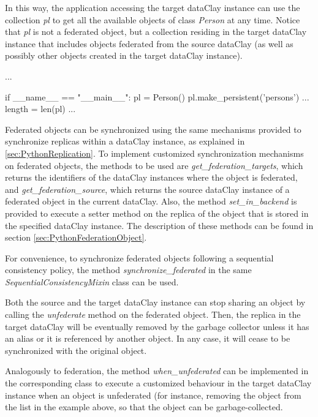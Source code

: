 \begin{tBox}
\begin{python}
class Person(DataClayObject):
     ...

     @dclayMethod()
     def when_federated():
     pl = PersonList.get_by_alias('persons')
     pl.add(self);
  }
}
\end{python}
\end{tBox}

In this way, the application accessing the target dataClay instance can use the collection \textit{pl} to get all the available objects of class \textit{Person} at any time. Notice that \textit{pl} is not a federated object, but a collection residing in the target dataClay instance that includes objects federated from the source dataClay (as well as possibly other objects created in the target dataClay instance).

\begin{tBox}
\begin{python}

...

  if __name__ == "__main__":
    pl = Person()
    pl.make_persistent('persons')
    ...
    length = len(pl)
    ...
    
\end{python}
\end{tBox}
 
Federated objects can be synchronized using the same mechanisms provided to synchronize replicas within a dataClay instance, as explained in \ref{sec:PythonReplication}. To implement customized synchronization mechanisms on federated objects, the methods to be used are \textit{get\_federation\_targets}, which returns the identifiers of the dataClay instances where the object is federated, and \textit{get\_federation\_source}, which returns the source dataClay instance of a federated object in the current dataClay. Also, the method \textit{set\_in\_backend} is provided to execute a setter method on the replica of the object that is stored in the specified dataClay instance. The description of these methods can be found in section \ref{sec:PythonFederationObject}.

For convenience, to synchronize federated objects following a sequential consistency policy, the method \textit{synchronize\_federated} in the same \textit{SequentialConsistencyMixin} class can be used.

Both the source and the target dataClay instance can stop sharing an object by calling the \textit{unfederate} method on the federated object. Then, the replica in the target dataClay will be eventually removed by the garbage collector unless it has an alias or it is referenced by another object. In any case, it will cease to be synchronized with the original object. 

Analogously to federation, the method \textit{when\_unfederated} can be implemented in the corresponding class to execute a customized behaviour in the target dataClay instance when an object is unfederated (for instance, removing the object from the list in the example above, so that the object can be garbage-collected.

\FEDERATION{

}